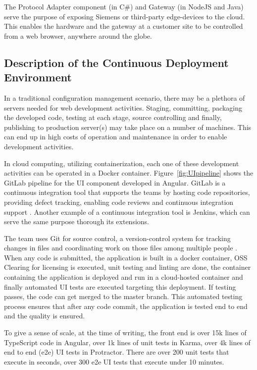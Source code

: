 \documentclass[conference]{IEEEtran}
\begin{document}
	The Protocol Adapter component (in C\#) and Gateway (in NodeJS and Java) serve the purpose of exposing Siemens or third-party edge-devices to the cloud. 
	This enables the hardware and the gateway at a customer site to be controlled from a web browser, anywhere around the globe.

	\subsection{Description of the Continuous Deployment Environment }
	
	In a traditional configuration management scenario, there may be a plethora of servers needed for web development activities.
	Staging, committing, packaging the developed code, testing at each stage, source controlling and finally, publishing to production server(s) may take place on a number of machines.
	This can end up in high costs of operation and maintenance in order to enable development activities.
	
	In cloud computing, utilizing containerization, each one of these development activities can be operated in a Docker container.
	Figure~\ref{fig:UIpipeline} shows the GitLab pipeline for the UI component developed in Angular.
	GitLab is a continuous integration tool that supports the teams by hosting code repositories, providing defect tracking, enabling code reviews and continuous integration support \cite{wiki:gitlab}. 
	Another example of a continuous integration tool is Jenkins, which can serve the same purpose thorough its extensions.


	The team uses Git for source control, a version-control system for tracking changes in files and coordinating work on those files among multiple people \cite{wiki:git}. 
	When any code is submitted, the application is built in a docker container, OSS Clearing for licensing is executed, unit testing and linting are done, the container containing the application is deployed and run in a cloud-hosted container and finally automated UI tests are executed targeting this deployment.
	If testing passes, the code can get merged to the master branch. 
	This automated testing process ensures that after any code commit, the application is tested end to end and the quality is ensured. 
	
	To give a sense of scale, at the time of writing, the front end is over 15k lines of TypeScript code in Angular, over 1k lines of unit tests in Karma, over 4k lines of end to end (e2e) UI tests in Protractor. 
	There are over 200 unit tests that execute in seconds, over 300 e2e UI tests that execute under 10 minutes. 
\end{document}
